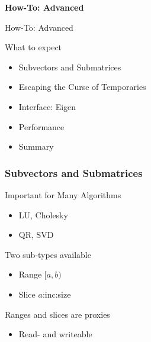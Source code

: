 
\begin{frame}{ }
 \begin{center}
  \Large \textbf{How-To: Advanced \ViennaCL}
 \end{center}
\end{frame}


\begin{frame}{How-To: Advanced \ViennaCL}

\begin{block}{What to expect}
  \begin{itemize}
   \item Subvectors and Submatrices
   \item Escaping the Curse of Temporaries
   \item Interface: Eigen
   \item Performance
   \item Summary
  \end{itemize}
\end{block}

\end{frame}



\begin{frame}[fragile]
\frametitle{Subvectors and Submatrices}
 \begin{block}{Important for Many Algorithms}
  \begin{itemize}
   \item LU, Cholesky
   \item QR, SVD
  \end{itemize}
 \end{block}

 \begin{block}{Two sub-types available}
  \begin{itemize}
   \item Range $[a,b)$
   \item Slice $a$:inc:size
  \end{itemize}
 \end{block}

 \begin{block}{Ranges and slices are proxies}
  \begin{itemize}
   \item Read- and writeable
  \end{itemize}
 \end{block}
 
\end{frame}



